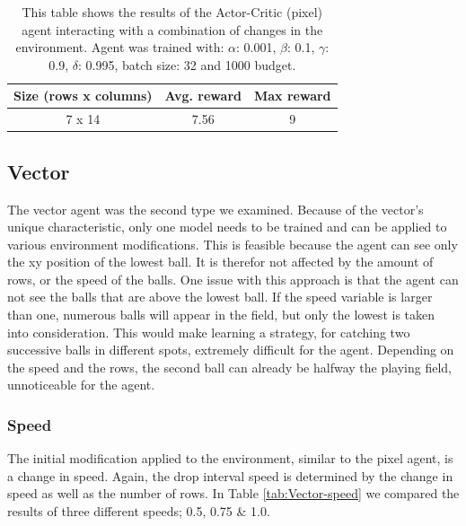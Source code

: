 \documentclass{article}
\begin{document}
\begin{table}[]
    \centering
    \begin{tabular}{|c|c|c|}
        \hline
        \textbf{Size (rows x columns)} & \textbf{Avg. reward} & \textbf{Max reward} \\
        \hline
        7 x 14                & 7.56        & 9    \\
        \hline              
    \end{tabular}
    \caption{This table shows the results of the Actor-Critic (pixel) agent interacting with a combination of changes in the environment. 
    Agent was trained with: $\alpha$: 0.001, $\beta$: 0.1, $\gamma$: 0.9, $\delta$: 0.995, batch size: 32 and 1000 budget. }
    \label{tab:Pixel-comb}
\end{table}


\subsection{Vector}
\label{ENV-vars}
The vector agent was the second type we examined.
Because of the vector's unique characteristic, only one model needs to be trained and can be applied to various environment modifications.
This is feasible because the agent can see only the xy position of the lowest ball. 
It is therefor not affected by the amount of rows, or the speed of the balls.
One issue with this approach is that the agent can not see the balls that are above the lowest ball.
If the speed variable is larger than one, numerous balls will appear in the field, but only the lowest is taken into consideration.
This would make learning a strategy, for catching two successive balls in different spots, extremely difficult for the agent. 
Depending on the speed and the rows, the second ball can already be halfway the playing field, unnoticeable for the agent. 


\subsubsection{Speed}
The initial modification applied to the environment, similar to the pixel agent, is a change in speed.
Again, the drop interval speed is determined by the change in speed as well as the number of rows. 
In Table \ref{tab:Vector-speed} we compared the results of three different speeds; 0.5, 0.75 \& 1.0. 
\end{document}
